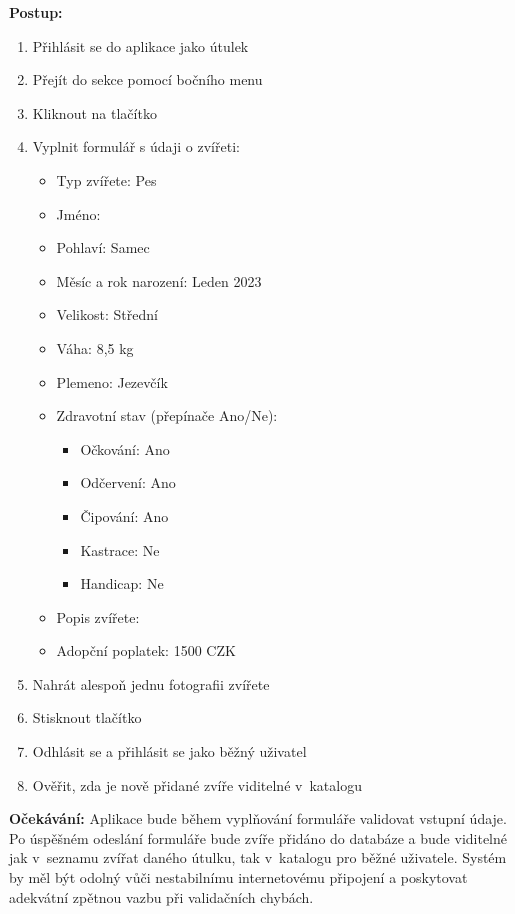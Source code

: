 \documentclass[czech, bp, kiv, he, iso690numb, pdf]{fasthesis}
\begin{document}
    \noindent \textbf{Postup:}
    \begin{enumerate}
        \item Přihlásit se do aplikace jako útulek
        \item Přejít do sekce  pomocí bočního menu
        \item Kliknout na tlačítko 
        \item Vyplnit formulář s údaji o zvířeti:
        \begin{itemize}
            \item Typ zvířete: Pes
            \item Jméno: 
            \item Pohlaví: Samec
            \item Měsíc a rok narození: Leden 2023
            \item Velikost: Střední
            \item Váha: 8,5 kg
            \item Plemeno: Jezevčík
            \item Zdravotní stav (přepínače Ano/Ne):
            \begin{itemize}
                \item Očkování: Ano
                \item Odčervení: Ano
                \item Čipování: Ano
                \item Kastrace: Ne
                \item Handicap: Ne
            \end{itemize}
            \item Popis zvířete: 
            \item Adopční poplatek: 1500 CZK
        \end{itemize}
        \item Nahrát alespoň jednu fotografii zvířete
        \item Stisknout tlačítko 
        \item Odhlásit se a přihlásit se jako běžný uživatel
        \item Ověřit, zda je nově přidané zvíře viditelné v~katalogu
    \end{enumerate}

    \noindent \textbf{Očekávání:}
    Aplikace bude během vyplňování formuláře validovat vstupní údaje. Po úspěšném odeslání formuláře bude zvíře přidáno do databáze a bude viditelné jak v~seznamu zvířat daného útulku, tak v~katalogu pro běžné uživatele. Systém by měl být odolný vůči nestabilnímu internetovému připojení a poskytovat adekvátní zpětnou vazbu při validačních chybách.\\
\end{document}
